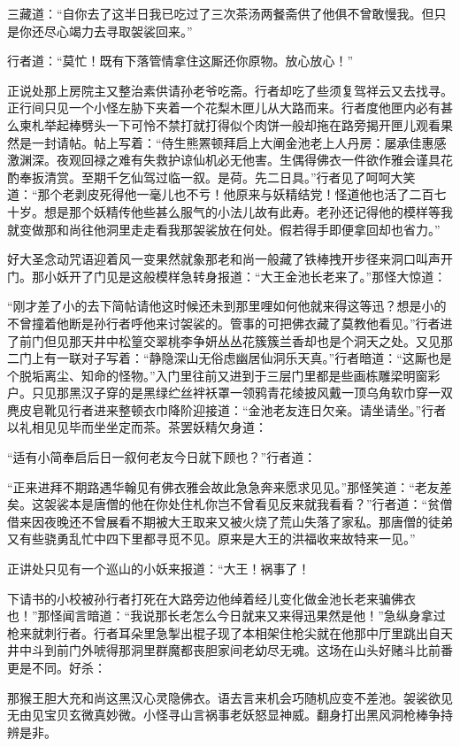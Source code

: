 \documentclass[12pt,UTF8]{ctexbook}
\begin{document}
{三藏道：“自你去了这半日我已吃过了三次茶汤两餐斋供了他俱不曾敢慢我。但只是你还尽心竭力去寻取袈裟回来。”

行者道：“莫忙！既有下落管情拿住这厮还你原物。放心放心！”

正说处那上房院主又整治素供请孙老爷吃斋。行者却吃了些须复驾祥云又去找寻。正行间只见一个小怪左胁下夹着一个花梨木匣儿从大路而来。行者度他匣内必有甚么柬札举起棒劈头一下可怜不禁打就打得似个肉饼一般却拖在路旁揭开匣儿观看果然是一封请帖。帖上写着：“侍生熊罴顿拜启上大阐金池老上人丹房：屡承佳惠感激渊深。夜观回禄之难有失救护谅仙机必无他害。生偶得佛衣一件欲作雅会谨具花酌奉扳清赏。至期千乞仙驾过临一叙。是荷。先二日具。”行者见了呵呵大笑道：“那个老剥皮死得他一毫儿也不亏！他原来与妖精结党！怪道他也活了二百七十岁。想是那个妖精传他些甚么服气的小法儿故有此寿。老孙还记得他的模样等我就变做那和尚往他洞里走走看我那袈裟放在何处。假若得手即便拿回却也省力。”

好大圣念动咒语迎着风一变果然就象那老和尚一般藏了铁棒拽开步径来洞口叫声开门。那小妖开了门见是这般模样急转身报道：“大王金池长老来了。”那怪大惊道：

“刚才差了小的去下简帖请他这时候还未到那里哩如何他就来得这等迅？想是小的不曾撞着他断是孙行者呼他来讨袈裟的。管事的可把佛衣藏了莫教他看见。”行者进了前门但见那天井中松篁交翠桃李争妍丛丛花簇簇兰香却也是个洞天之处。又见那二门上有一联对子写着：“静隐深山无俗虑幽居仙洞乐天真。”行者暗道：“这厮也是个脱垢离尘、知命的怪物。”入门里往前又进到于三层门里都是些画栋雕梁明窗彩户。只见那黑汉子穿的是黑绿纻丝袢袄罩一领鸦青花绫披风戴一顶乌角软巾穿一双麂皮皂靴见行者进来整顿衣巾降阶迎接道：“金池老友连日欠亲。请坐请坐。”行者以礼相见见毕而坐坐定而茶。茶罢妖精欠身道：

“适有小简奉启后日一叙何老友今日就下顾也？”行者道：

“正来进拜不期路遇华翰见有佛衣雅会故此急急奔来愿求见见。”那怪笑道：“老友差矣。这袈裟本是唐僧的他在你处住札你岂不曾看见反来就我看看？”行者道：“贫僧借来因夜晚还不曾展看不期被大王取来又被火烧了荒山失落了家私。那唐僧的徒弟又有些骁勇乱忙中四下里都寻觅不见。原来是大王的洪福收来故特来一见。”

正讲处只见有一个巡山的小妖来报道：“大王！祸事了！

下请书的小校被孙行者打死在大路旁边他绰着经儿变化做金池长老来骗佛衣也！”那怪闻言暗道：“我说那长老怎么今日就来又来得迅果然是他！”急纵身拿过枪来就刺行者。行者耳朵里急掣出棍子现了本相架住枪尖就在他那中厅里跳出自天井中斗到前门外唬得那洞里群魔都丧胆家间老幼尽无魂。这场在山头好赌斗比前番更是不同。好杀：

那猴王胆大充和尚这黑汉心灵隐佛衣。语去言来机会巧随机应变不差池。袈裟欲见无由见宝贝玄微真妙微。小怪寻山言祸事老妖怒显神威。翻身打出黑风洞枪棒争持辨是非。

}
\end{document}
